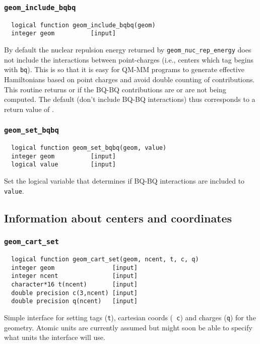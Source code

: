 \subsubsection{{\tt geom\_include\_bqbq}}
\label{sec:incbqbq}
\begin{verbatim}
  logical function geom_include_bqbq(geom)
  integer geom          [input]
\end{verbatim}
By default the nuclear repulsion energy returned by
\verb+geom_nuc_rep_energy+ does not include the interactions between
point-charges (i.e., centers which tag begins with \verb+bq+).  This
is so that it is easy for QM-MM programs to generate effective
Hamiltonians based on point charges and avoid double counting of
contributions.  This routine returns \TRUE or \FALSE
if the BQ-BQ contributions are or are not being computed.  The default
(don't include BQ-BQ interactions) thus corresponds to a return value
of \FALSE.

\subsubsection{{\tt geom\_set\_bqbq}}
\label{sec:setbqbq}
\begin{verbatim}
  logical function geom_set_bqbq(geom, value)
  integer geom          [input]
  logical value         [input]
\end{verbatim}
Set the logical variable that determines if BQ-BQ interactions are
included to {\tt value}.

\subsection{Information about centers and coordinates}

\subsubsection{{\tt geom\_cart\_set}}
\begin{verbatim}
  logical function geom_cart_set(geom, ncent, t, c, q)
  integer geom                [input]
  integer ncent               [input]
  character*16 t(ncent)       [input]
  double precision c(3,ncent) [input]
  double precision q(ncent)   [input]
\end{verbatim}
Simple interface for setting tags ({\tt t}), cartesian coords ({\tt
  c}) and charges ({\tt q}) for the geometry.  Atomic units are
currently assumed but might soon be able to specify what units the
interface will use.

